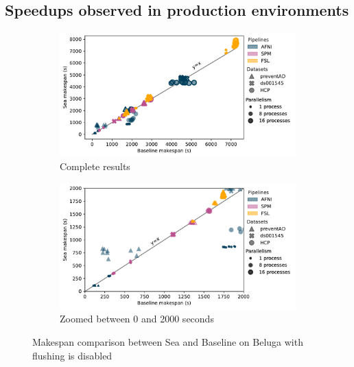 \subsection{Speedups observed in production environments}

\begin{figure}

\begin{subfigure}{\textwidth}
    \centering
    \captionsetup{width=.85\linewidth}
    \includegraphics[width=\columnwidth]{figures/sea-neuro/beluga_withoutflush_nozoom.pdf}%
    \caption{Complete results}\label{fig:seaneuro:belugafull}
\end{subfigure}
\begin{subfigure}{\textwidth}
    \centering
    \captionsetup{width=.85\linewidth}
    \includegraphics[width=\linewidth]{figures/sea-neuro/beluga_withoutflush_zoom.pdf}
    \caption{Zoomed between 0 and 2000 seconds}\label{fig:seaneuro:belugazoom}
\end{subfigure}
\caption{Makespan comparison between Sea and Baseline on Beluga with flushing is disabled}
\label{fig:seaneuro:beluga-noflush}
\end{figure}

